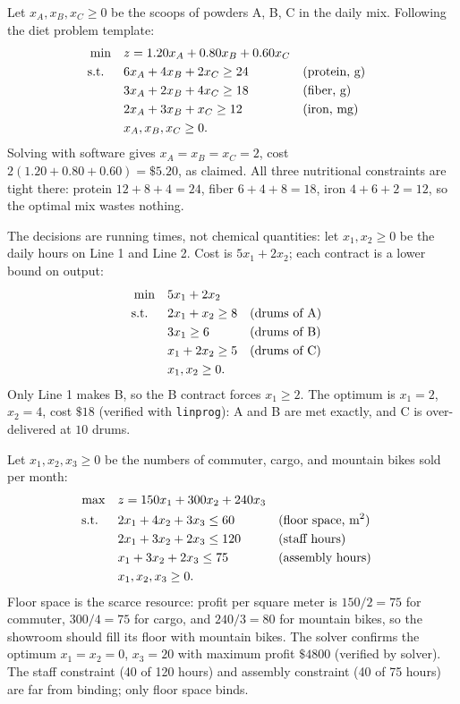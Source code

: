 Let $x_A, x_B, x_C \geq 0$ be the scoops of powders A, B, C in the daily mix. Following the diet problem template:
\begin{align*}
\min \quad & z = 1.20x_A + 0.80x_B + 0.60x_C\\
\text{s.t.}\;\; \quad & 6x_A + 4x_B + 2x_C \geq 24 && \text{(protein, g)}\\
& 3x_A + 2x_B + 4x_C \geq 18 && \text{(fiber, g)}\\
& 2x_A + 3x_B + x_C \geq 12 && \text{(iron, mg)}\\
& x_A, x_B, x_C \geq 0.
\end{align*}
Solving with software gives $x_A = x_B = x_C = 2$, cost $2(1.20 + 0.80 + 0.60) = \$5.20$, as claimed. All three nutritional constraints are tight there: protein $12 + 8 + 4 = 24$, fiber $6 + 4 + 8 = 18$, iron $4 + 6 + 2 = 12$, so the optimal mix wastes nothing.


The decisions are running times, not chemical quantities: let $x_1, x_2 \ge 0$ be the daily hours on Line 1 and Line 2.  Cost is $5x_1 + 2x_2$; each contract is a lower bound on output:
\begin{align*}
\min \quad & 5x_1 + 2x_2\\
\text{s.t.}\;\; \quad & 2x_1 + x_2 \geq 8 && \text{(drums of A)}\\
& 3x_1 \geq 6 && \text{(drums of B)}\\
& x_1 + 2x_2 \geq 5 && \text{(drums of C)}\\
& x_1, x_2 \geq 0.
\end{align*}
Only Line 1 makes B, so the B contract forces $x_1 \ge 2$.  The optimum is $x_1 = 2$, $x_2 = 4$, cost $\$18$ (verified with \texttt{linprog}): A and B are met exactly, and C is over-delivered at $10$ drums.


Let $x_1, x_2, x_3 \geq 0$ be the numbers of commuter, cargo, and mountain bikes sold per month:
\begin{align*}
\max \quad & z = 150x_1 + 300x_2 + 240x_3\\
\text{s.t.}\;\; \quad & 2x_1 + 4x_2 + 3x_3 \leq 60 && \text{(floor space, m$^2$)}\\
& 2x_1 + 3x_2 + 2x_3 \leq 120 && \text{(staff hours)}\\
& x_1 + 3x_2 + 2x_3 \leq 75 && \text{(assembly hours)}\\
& x_1, x_2, x_3 \geq 0.
\end{align*}
Floor space is the scarce resource: profit per square meter is $150/2 = 75$ for commuter, $300/4 = 75$ for cargo, and $240/3 = 80$ for mountain bikes, so the showroom should fill its floor with mountain bikes. The solver confirms the optimum $x_1 = x_2 = 0$, $x_3 = 20$ with maximum profit $\$4800$ (verified by solver). The staff constraint (40 of 120 hours) and assembly constraint (40 of 75 hours) are far from binding; only floor space binds.

